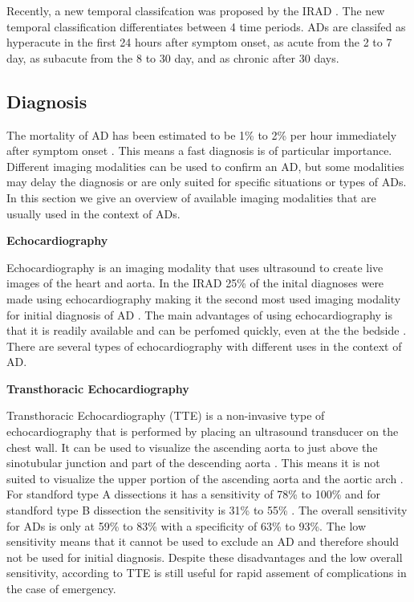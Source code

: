 \documentclass[thesis.tex]{subfiles}
\begin{document}
Recently, a new temporal classifcation was proposed by the IRAD \cite{doi:10.1161/CIRCULATIONAHA.117.031264}. The new temporal classification differentiates between 4 time periods. ADs are classifed as hyperacute in the first 24 hours after symptom onset, as acute from the 2 to 7 day, as subacute from the 8 to 30 day, and as chronic after 30 days.  

\subsection{Diagnosis}
The mortality of AD has been estimated to be 1\% to 2\% per hour immediately after symptom onset \cite{doi:10.1161/CIRCULATIONAHA.117.031264,meszaros2000epidemiology,goldfinger2014thoracic}. This means a fast diagnosis is of particular importance. Different imaging modalities can be used to confirm an AD, but some modalities may delay the diagnosis or are only suited for specific situations or types of ADs. In this section we give an overview of available imaging modalities that are usually used in the context of ADs.

\textbf{Echocardiography}

Echocardiography is an imaging modality that uses ultrasound to create live images of the heart and aorta. In the IRAD 25\% of the inital diagnoses were made using echocardiography making it the second most used imaging modality for initial diagnosis of AD \cite{doi:10.1161/CIRCULATIONAHA.117.031264}. The main advantages of using echocardiography is that it is readily available and can be perfomed quickly, even at the the bedside \cite{baliga2014role}. There are several types of echocardiography with different uses in the context of AD.

\textbf{Transthoracic Echocardiography}

Transthoracic Echocardiography (TTE) is a non-invasive type of echocardiography that is performed by placing an ultrasound transducer on the chest wall. It can be used to visualize the ascending aorta to just above the sinotubular junction and part of the descending aorta \cite{baliga2014role}. This means it is not suited to visualize the upper portion of the ascending aorta and the aortic arch \cite{baliga2014role}. For standford type A dissections it has a sensitivity of 78\% to 100\% and for standford type B dissection the sensitivity is 31\% to 55\% \cite{baliga2014role}. The overall sensitivity for ADs is only at 59\% to 83\% with a specificity of 63\% to 93\%. The low sensitivity means that it cannot be used to exclude an AD and therefore should not be used for initial diagnosis. Despite these disadvantages and the low overall sensitivity, according to \cite{baliga2014role} TTE is still useful for rapid assement of complications in the case of emergency. 
\end{document}
